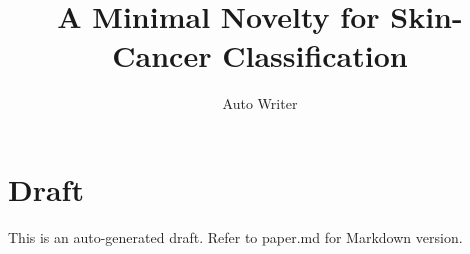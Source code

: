 \documentclass[11pt]{article}
\title{A Minimal Novelty for Skin-Cancer Classification}
\author{Auto Writer}
\date{}
\begin{document}
\maketitle
\section*{Draft}
This is an auto-generated draft. Refer to paper.md for Markdown version.
\end{document}
